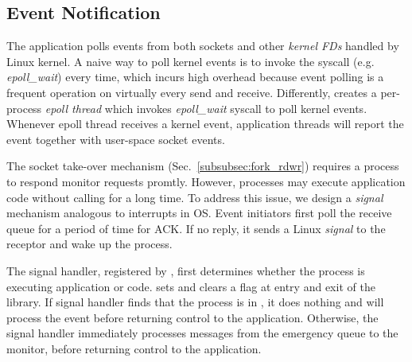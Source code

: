 \subsection{Event Notification}
\label{subsec:process-mux}

The application polls events from both sockets and other \textit{kernel FDs} handled by Linux kernel.
A naive way to poll kernel events is to invoke the syscall (e.g. \textit{epoll\_wait}) every time, which incurs high overhead because event polling is a frequent operation on virtually every send and receive.
Differently, \libipc{} creates a per-process \textit{epoll thread} which invokes \textit{epoll\_wait} syscall to poll kernel events. Whenever epoll thread receives a kernel event, application threads will report the event together with user-space socket events.

The socket take-over mechanism (Sec.~\ref{subsubsec:fork_rdwr}) requires a process to respond monitor requests promtly. However, processes may execute application code without calling \libipc{} for a long time. To address this issue, we design a \textit{signal} mechanism analogous to interrupts in OS. Event initiators first poll the receive queue for a period of time for ACK. If no reply, it sends a Linux \textit{signal} to the receptor and wake up the process.

The signal handler, registered by \libipc{}, first determines whether the process is executing application or \libipc{} code. \libipc{} sets and clears a flag at entry and exit of the library. If signal handler finds that the process is in \libipc, it does nothing and \libipc{} will process the event before returning control to the application. Otherwise, the signal handler immediately processes messages from the emergency queue to the monitor, before returning control to the application. 

